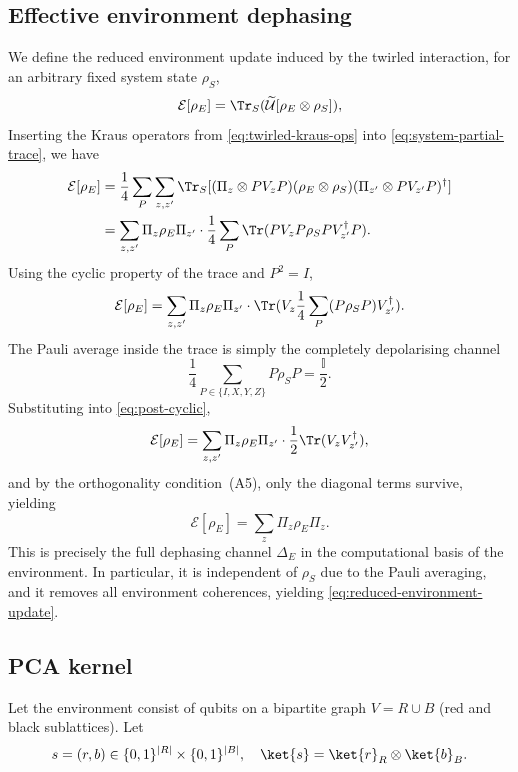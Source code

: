 \subsection{Effective environment dephasing}
We define the reduced environment update induced by the twirled interaction, for an arbitrary fixed system state \(\rho_S\),
\begin{equation}\label{eq:system-partial-trace}
    \mathcal{E}[\rho_E] = \Tr_S(\widetilde{\mathcal{U}}[\rho_E \otimes \rho_S]),
\end{equation}
Inserting the Kraus operators from \cref{eq:twirled-kraus-ops} into \cref{eq:system-partial-trace}, we have
\begin{equation}
    \begin{split}
        \mathcal{E}[\rho_E] 
        &= \frac{1}{4} \sum_P \sum_{z,z'} \Tr_S[(\Pi_z \otimes PV_zP) (\rho_E \otimes \rho_S) (\Pi_{z'} \otimes PV_{z'}P)^\dagger] \\
        &= \sum_{z,z'} \Pi_z \rho_E \Pi_{z'} \cdot \frac{1}{4} \sum_P \Tr(P V_z P \rho_S P V_{z'}^\dagger P).
    \end{split}
\end{equation}
Using the cyclic property of the trace and \(P^2 = I\),
\begin{equation}\label{eq:post-cyclic}
    \mathcal{E}[\rho_E] = \sum_{z,z'} \Pi_z \rho_E \Pi_{z'} \cdot \Tr(V_z \frac{1}{4}\sum_P(P \rho_S P) V_{z'}^\dagger).
\end{equation}
The Pauli average inside the trace is simply the completely depolarising channel
\begin{equation}
    \frac{1}{4}\sum_{P \in \{I,X,Y,Z\}} P \rho_S P = \frac{\mathbb{I}}{2}.
\end{equation}
Substituting into \cref{eq:post-cyclic},
\begin{equation}
    \mathcal{E}[\rho_E] = \sum_{z,z'} \Pi_z \rho_E \Pi_{z'} \cdot \frac{1}{2} \Tr(V_z V_{z'}^\dagger),
\end{equation}
and by the orthogonality condition~(A5), only the diagonal terms survive, yielding
\begin{equation}
    \mathcal{E}[\rho_E] = \sum_z \Pi_z \rho_E \Pi_z.
\end{equation}
This is precisely the full dephasing channel \(\Delta_E\) in the computational basis of the environment. In particular, it is independent of \(\rho_S\) due to the Pauli averaging, and it removes all environment coherences, yielding \cref{eq:reduced-environment-update}.

\subsection{PCA kernel}
Let the environment consist of qubits on a bipartite graph \(V = R \cup B\) (red and black sublattices). Let
\begin{equation}
    s = (r,b) \in \{0,1\}^{|R|} \times \{0,1\}^{|B|}, \quad \ket{s} = \ket{r}_R \otimes \ket{b}_B.
\end{equation}

